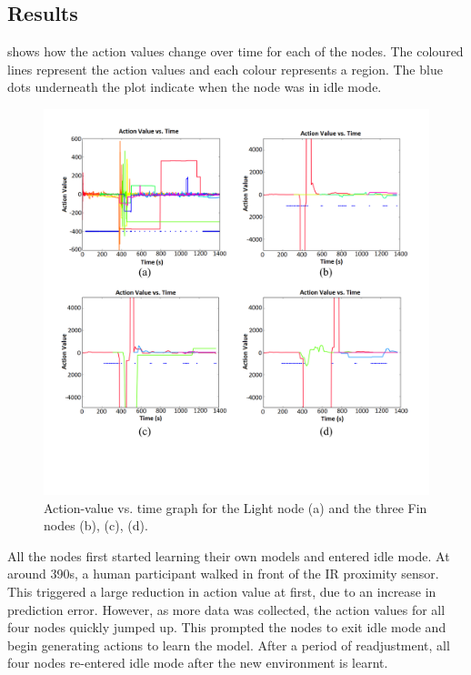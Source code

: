 \subsection{Results}

 shows how the action values change over time for each of the nodes. The coloured lines represent the action values and each colour represents a region. The blue dots underneath the plot indicate when the node was in idle mode.

\begin{figure} [!htbp]
	\centering
	\includegraphics[width=1.0\textwidth]{"fig/validations/Single_Cluster Action Value Vs Time"}
	\caption[Action value vs. time graph for the single cluster experiment]{Action-value vs. time graph for the Light node (a) and the three Fin nodes (b), (c), (d).}
	\label{fig:Single_Cluster Action Value Vs Time}
\end{figure}

All the nodes first started learning their own models and entered idle mode. At around 390s, a human participant walked in front of the IR proximity sensor. This triggered a large reduction in action value at first, due to an increase in prediction error. However, as more data was collected, the action values for all four nodes quickly jumped up. This prompted the nodes to exit idle mode and begin generating actions to learn the model. After a period of readjustment, all four nodes re-entered idle mode after the new environment is learnt. 

